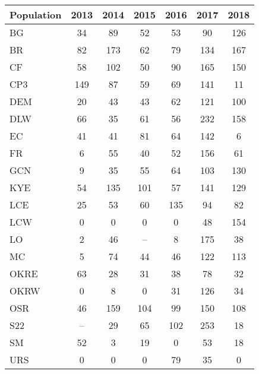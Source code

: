 \documentclass[12pt, oneside, titlepage]{article}   	%
\begin{document}
  \label{tab:sigma} 
\begin{table}[ht]
\centering
\begin{tabular}{lcccccc}
  \hline
Population & 2013 & 2014 & 2015 & 2016 & 2017 & 2018 \\ 
  \hline
BG &  34 &  89 &  52 &  53 &  90 & 126 \\ 
  BR &  82 & 173 &  62 &  79 & 134 & 167 \\ 
  CF &  58 & 102 &  50 &  90 & 165 & 150 \\ 
  CP3 & 149 &  87 &  59 &  69 & 141 &  11 \\ 
  DEM &  20 &  43 &  43 &  62 & 121 & 100 \\ 
  DLW &  66 &  35 &  61 &  56 & 232 & 158 \\ 
  EC &  41 &  41 &  81 &  64 & 142 &   6 \\ 
  FR &   6 &  55 &  40 &  52 & 156 &  61 \\ 
  GCN &   9 &  35 &  55 &  64 & 103 & 130 \\ 
  KYE &  54 & 135 & 101 &  57 & 141 & 129 \\ 
  LCE &  25 &  53 &  60 & 135 &  94 &  82 \\ 
  LCW &   0 &   0 &   0 &   0 &  48 & 154 \\ 
  LO &   2 &  46 & -- &   8 & 175 &  38 \\ 
  MC &   5 &  74 &  44 &  46 & 122 & 113 \\ 
  OKRE &  63 &  28 &  31 &  38 &  78 &  32 \\ 
  OKRW &   0 &   8 &   0 &  31 & 126 &  34 \\ 
  OSR &  46 & 159 & 104 &  99 & 150 & 108 \\ 
  S22 & -- &  29 &  65 & 102 & 253 &  18 \\ 
  SM &  52 &   3 &  19 &   0 &  53 &  18 \\ 
  URS &   0 &   0 &   0 &  79 &  35 &   0 \\ 
     \hline
\end{tabular}
\end{table}
 
\newpage


 \small
\setlength\tabcolsep{0pt} 
\end{document}
